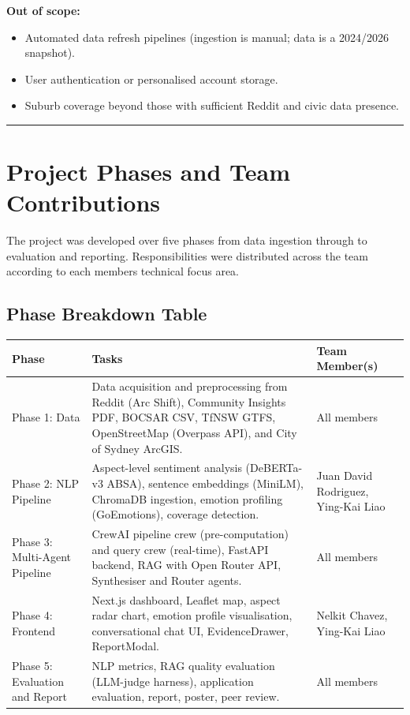\documentclass[11pt,a4paper]{article}
\newcounter{none}
\providecommand{\tightlist}{%
  \setlength{\itemsep}{0pt}\setlength{\parskip}{0pt}}
\begin{document}
\textbf{Out of scope:}

\begin{itemize}
\tightlist
\item
  Automated data refresh pipelines (ingestion is manual; data is a 2024/2026 snapshot).
\item
  User authentication or personalised account storage.
\item
  Suburb coverage beyond those with sufficient Reddit and civic data presence.
\end{itemize}

\begin{center}\rule{0.5\linewidth}{0.5pt}\end{center}

\clearpage
\section{Project Phases and Team Contributions}\label{3-project-phases-and-team-contributions}

The project was developed over five phases from data ingestion through to evaluation and reporting. Responsibilities were distributed across the team according to each member\textquotesingle s technical focus area.

\subsection{Phase Breakdown Table}\label{phase-breakdown-table}

{\def\LTcaptype{none} %
\begin{longtable}{|L{0.18\textwidth}|L{0.56\textwidth}|L{0.18\textwidth}|}
\hline
\textbf{Phase} & \textbf{Tasks} & \textbf{Team Member(s)} \\
\hline
\endhead
\hline
\endlastfoot
Phase 1: Data & Data acquisition and preprocessing from Reddit (Arc Shift), Community Insights PDF, BOCSAR CSV, TfNSW GTFS, OpenStreetMap (Overpass API), and City of Sydney ArcGIS. & All members \\
\hline
Phase 2: NLP Pipeline & Aspect-level sentiment analysis (DeBERTa-v3 ABSA), sentence embeddings (MiniLM), ChromaDB ingestion, emotion profiling (GoEmotions), coverage detection. & Juan David Rodriguez, Ying-Kai Liao \\
\hline
Phase 3: Multi-Agent Pipeline & CrewAI pipeline crew (pre-computation) and query crew (real-time), FastAPI backend, RAG with Open Router API, Synthesiser and Router agents. & All members \\
\hline
Phase 4: Frontend & Next.js dashboard, Leaflet map, aspect radar chart, emotion profile visualisation, conversational chat UI, EvidenceDrawer, ReportModal. & Nelkit Chavez, Ying-Kai Liao \\
\hline
Phase 5: Evaluation and Report & NLP metrics, RAG quality evaluation (LLM-judge harness), application evaluation, report, poster, peer review. & All members \\
\hline
\end{longtable}
}
\end{document}
